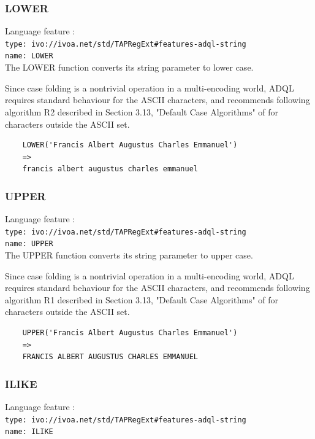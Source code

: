 \documentclass[11pt,a4paper]{ivoa}
\begin{document}
\subsubsection{LOWER}
\label{sec:string.functions.lower}
{\footnotesize Language feature :}\\
{\footnotesize \verb|type: ivo://ivoa.net/std/TAPRegExt#features-adql-string|}\\
{\footnotesize \verb|name: LOWER|}\\

The LOWER function converts its string parameter to lower case.

Since case folding is a nontrivial operation in a multi-encoding world,
ADQL requires standard behaviour for the ASCII characters, and recommends
following algorithm R2 described in Section 3.13, "Default Case Algorithms"
of \citet{std:UNICODE} for characters outside the ASCII set.

\begin{verbatim}
    LOWER('Francis Albert Augustus Charles Emmanuel')
    =>
    francis albert augustus charles emmanuel
\end{verbatim}

\subsubsection{UPPER}
\label{sec:string.functions.upper}
{\footnotesize Language feature :}\\
{\footnotesize \verb|type: ivo://ivoa.net/std/TAPRegExt#features-adql-string|}\\
{\footnotesize \verb|name: UPPER|}\\

The UPPER function converts its string parameter to upper case.

Since case folding is a nontrivial operation in a multi-encoding world,
ADQL requires standard behaviour for the ASCII characters, and recommends
following algorithm R1 described in Section 3.13, "Default Case Algorithms"
of \citet{std:UNICODE} for characters outside the ASCII set.

\begin{verbatim}
    UPPER('Francis Albert Augustus Charles Emmanuel')
    =>
    FRANCIS ALBERT AUGUSTUS CHARLES EMMANUEL
\end{verbatim}

\subsubsection{ILIKE}
\label{sec:string.functions.ilike}
{\footnotesize Language feature :}\\
{\footnotesize \verb|type: ivo://ivoa.net/std/TAPRegExt#features-adql-string|}\\
{\footnotesize \verb|name: ILIKE|}\\
\end{document}

